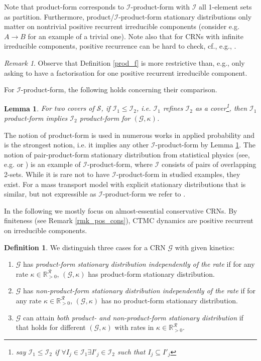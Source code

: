 \documentclass{amsart}
\newtheorem{lemma}[theorem]{Lemma}
\theoremstyle{definition}
\newtheorem{definition}[theorem]{Definition}
\theoremstyle{remark}
\newtheorem{remark}[theorem]{Remark}
\theoremstyle{Conjecture/open problem}
\theoremstyle{assumption}
\theoremstyle{conjecture}
\def\I{\mathcal{I}}
\def\k{\kappa}
\def\cG{\mathcal{G}}
\def\cR{\mathcal{R}}
\def\cS{\mathcal{S}}
\def\R{\mathbb{R}}
\numberwithin{equation}{section}
\begin{document}
Note that product-form corresponds to $\mathcal{I}$-product-form with $\mathcal{I}$ all 1-element sets as partition. Furthermore, product/$\I$-product-form stationary distributions only matter on nontrivial positive recurrent irreducible components (consider e.g.
$
A\to B$ for an example of a trivial one). Note also that for CRNs with infinite irreducible components, positive recurrence can be hard to check, cf., e.g., \cite{xu2019dynamics}.
\begin{remark}
Observe that Definition \ref{prod_f} is more restrictive than, e.g., only asking to have a factorisation for one positive recurrent irreducible component.
\end{remark}

For $\I$-product-form, the following holds concerning their comparison.

\begin{lemma}\label{prod_str}
For two covers of $\cS$, if $\I_1\leq\I_2$, i.e. $\I_1$ refines $\I_2$ as a cover\footnote{say $\I_1\leq\I_2$ if $\forall I_j\in\I_1\exists I'_j\in\I_2$ such that $I_j\subseteq I'_j$}, then $\I_1$ product-form implies $\I_2$ product-form for $(\cG,\k)$.
\end{lemma}

The notion of product-form is used in numerous works in applied probability  \cite{liggett,Goutsias_ov,serfozo,kipnis1999sli} and is the strongest notion, i.e. it implies any other $\I$-product-form by Lemma \ref{prod_str}. The notion of pair-product-form
stationary distribution from statistical physics (see, e.g. \cite[Section 6.1.1]{Evans1} or \cite[Section 3.6.1]{Schadschn_cx}) is an example
of $\I$-product-form,  where $\I$ consists of pairs of overlapping 2-sets. 
While it is rare not to have $\I$-product-form in studied examples, they exist.
For a mass transport model with explicit stationary distributions that is similar, but not expressible as $\I$-product-form we refer to \cite{Guioth}. 




In the following we mostly focus on almost-essential conservative CRNs. By finiteness (see Remark \ref{rmk_pos_cons}), CTMC dynamics are positive recurrent on irreducible components.
\begin{definition}\label{three_cas}
We distinguish three cases for a CRN $\cG$ with given kinetics:
\begin{enumerate}
\item[(I)] $\cG$ has \emph{product-form stationary distribution independently 
of the rate}
if for any rate $\k\in\R_{>0}^\cR$, $(\cG,\k)$ has product-form stationary distribution.
\item[(N)] $\cG$ has \emph{non-product-form stationary distribution independently of the rate} if for any rate $\k\in\R_{>0}^\cR$, $(\cG,\k)$ has no product-form stationary distribution.
\item[(E)] $\cG$ can attain \emph{both product- and non-product-form stationary distribution} if that holds for different $(\cG,\k)$ with rates in $\k\in\R_{>0}^\cR$.

\end{enumerate}
\end{definition}
\end{document}
